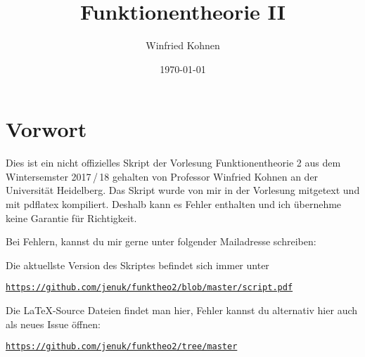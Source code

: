 \documentclass[parskip=half]{scrbook}
\title{Funktionentheorie II}
\author{Winfried Kohnen}
\date{\today}
\begin{document}
\pagestyle{plain}

\maketitle

\chapter*{Vorwort}

Dies ist ein nicht offizielles Skript der Vorlesung Funktionentheorie 2 aus dem Wintersemster 2017\,/\,18 gehalten von Professor Winfried Kohnen an der Universität Heidelberg.
Das Skript wurde von mir in der Vorlesung mitgetext und mit pdflatex kompiliert.
Deshalb kann es Fehler enthalten und ich übernehme keine Garantie für Richtigkeit.

Bei Fehlern, kannst du mir gerne unter folgender Mailadresse schreiben:

\begin{center}
\end{center}

Die aktuellste Version des Skriptes befindet sich immer unter
\begin{center}
\texttt{\url{https://github.com/jenuk/funktheo2/blob/master/script.pdf}}
\end{center}

Die \LaTeX-Source Dateien findet man hier, Fehler kannst du alternativ hier auch als neues Issue öffnen:
\begin{center}
\texttt{\url{https://github.com/jenuk/funktheo2/tree/master}}
\end{center}

\clearpage
{}
{}
\tableofcontents

\clearpage
{}
\setcounter{page}{0}
\pagestyle{fancy}









\printindex

\cleardoublepage
{}
{}
\listoftheorems[ignoreall, onlynamed={satz,satz-list,satz-noind,satz-ind}]
\end{document}
